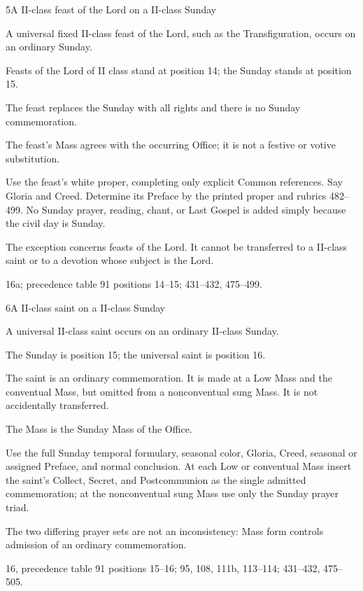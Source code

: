 \begin{casefile}{5}{A II-class feast of the Lord on a II-class Sunday}
\item[Calendar facts] A universal fixed II-class feast of the Lord, such as the Transfiguration, occurs on an ordinary Sunday.
\item[Ranks and rows] Feasts of the Lord of II class stand at position 14; the Sunday stands at position 15.
\item[Impeded item] The feast replaces the Sunday with all rights and there is no Sunday commemoration.
\item[Mass category] The feast's Mass agrees with the occurring Office; it is not a festive or votive substitution.
\item[Assembly] Use the feast's white proper, completing only explicit Common references.  Say Gloria and Creed.  Determine its Preface by the printed proper and rubrics 482--499.  No Sunday prayer, reading, chant, or Last Gospel is added simply because the civil day is Sunday.
\item[Boundary] The exception concerns feasts of the Lord.  It cannot be transferred to a II-class saint or to a devotion whose subject is the Lord.
\item[Rubric locus] 16a; precedence table 91 positions 14--15; 431--432, 475--499.
\end{casefile}

\begin{casefile}{6}{A II-class saint on a II-class Sunday}
\item[Calendar facts] A universal II-class saint occurs on an ordinary II-class Sunday.
\item[Ranks and rows] The Sunday is position 15; the universal saint is position 16.
\item[Impeded item] The saint is an ordinary commemoration.  It is made at a Low Mass and the conventual Mass, but omitted from a nonconventual sung Mass.  It is not accidentally transferred.
\item[Mass category] The Mass is the Sunday Mass of the Office.
\item[Assembly] Use the full Sunday temporal formulary, seasonal color, Gloria, Creed, seasonal or assigned Preface, and normal conclusion.  At each Low or conventual Mass insert the saint's Collect, Secret, and Postcommunion as the single admitted commemoration; at the nonconventual sung Mass use only the Sunday prayer triad.
\item[Boundary] The two differing prayer sets are not an inconsistency: Mass form controls admission of an ordinary commemoration.
\item[Rubric locus] 16, precedence table 91 positions 15--16; 95, 108, 111b, 113--114; 431--432, 475--505.
\end{casefile}

